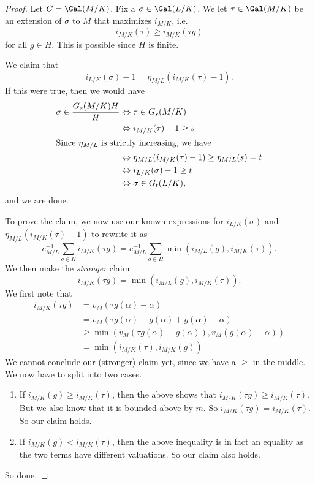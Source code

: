 \documentclass[a4paper]{article}
\begin{document}
\begin{proof}
  Let $G = \Gal(M/K)$. Fix a $\sigma \in \Gal(L/K)$. We let $\tau \in \Gal(M/K)$ be an extension of $\sigma$ to $M$ that maximizes $i_{M/K}$, i.e.
  \[
    i_{M/K}(\tau) \geq i_{M/K}(\tau g)
  \]
  for all $g \in H$. This is possible since $H$ is finite.

  We claim that
  \[
    i_{L/K}(\sigma) - 1 = \eta_{M/L}(i_{M/K}(\tau) - 1).
  \]
  If this were true, then we would have
  \begin{align*}
    \sigma \in \frac{G_s(M/K)H}{H} &\Leftrightarrow \tau \in G_s(M/K)\\
    &\Leftrightarrow i_{M/K}(\tau) - 1 \geq s\\
    \intertext{Since $\eta_{M/L}$ is strictly increasing, we have}
    &\Leftrightarrow \eta_{M/L}(i_{M/K}(\tau) - 1) \geq \eta_{M/L}(s) = t\\
    &\Leftrightarrow i_{L/K}(\sigma) - 1 \geq t \\
    &\Leftrightarrow \sigma \in G_t(L/K),
  \end{align*}
  and we are done.

  To prove the claim, we now use our known expressions for $i_{L/K}(\sigma)$ and $\eta_{M/L}(i_{M/K}(\tau) - 1)$ to rewrite it as
  \[
    e^{-1}_{M/L} \sum_{g \in H} i_{M/K}(\tau g) = e_{M/L}^{-1} \sum_{g \in H} \min (i_{M/L}(g), i_{M/K}(\tau)).
  \]
  We then make the \emph{stronger} claim
  \[
    i_{M/K}(\tau g) = \min (i_{M/L}(g), i_{M/K}(\tau)).
  \]
  We first note that
  \begin{align*}
    i_{M/K}(\tau g) &= v_M(\tau g(\alpha) - \alpha) \\
    &= v_M(\tau g(\alpha) - g(\alpha) + g(\alpha) - \alpha) \\
    &\geq \min(v_M(\tau g(\alpha) - g(\alpha)), v_M(g(\alpha) - \alpha))\\
    &= \min(i_{M/K}(\tau), i_{M/K}(g))
  \end{align*}
  We cannot conclude our (stronger) claim yet, since we have a $\geq$ in the middle. We now have to split into two cases.
  \begin{enumerate}
    \item If $i_{M/K}(g) \geq i_{M/K}(\tau)$, then the above shows that $i_{M/K}(\tau g) \geq i_{M/K}(\tau)$. But we also know that it is bounded above by $m$. So $i_{M/K}(\tau g) = i_{M/K}(\tau)$. So our claim holds.
    \item If $i_{M/K}(g) < i_{M/K}(\tau)$, then the above inequality is in fact an equality as the two terms have different valuations. So our claim also holds.
  \end{enumerate}
  So done.
\end{proof}
\end{document}
